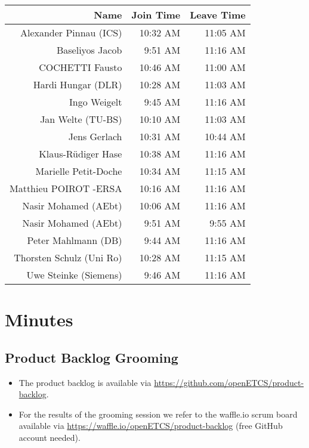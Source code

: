 \documentclass[a4paper, 11pt]{article}
\begin{document}
\begin{table}[htbp]
    \begin{tabular}{rrr}
    \toprule
    \textbf{Name} & \textbf{Join Time} & \textbf{Leave Time} \\
    \midrule
    Alexander Pinnau (ICS) & 10:32 AM & 11:05 AM \\
    Baseliyos Jacob & 9:51 AM & 11:16 AM \\
    COCHETTI Fausto & 10:46 AM & 11:00 AM \\
    Hardi Hungar (DLR) & 10:28 AM & 11:03 AM \\
    Ingo Weigelt & 9:45 AM & 11:16 AM \\
    Jan Welte (TU-BS) & 10:10 AM & 11:03 AM \\
    Jens Gerlach & 10:31 AM & 10:44 AM \\
    Klaus-R\"udiger Hase & 10:38 AM & 11:16 AM \\
    Marielle Petit-Doche & 10:34 AM & 11:15 AM \\
    Matthieu POIROT -ERSA & 10:16 AM & 11:16 AM \\
    Nasir Mohamed (AEbt) & 10:06 AM & 11:16 AM \\
    Nasir Mohamed (AEbt) & 9:51 AM & 9:55 AM \\
    Peter Mahlmann (DB) & 9:44 AM & 11:16 AM \\
    Thorsten Schulz (Uni Ro) & 10:28 AM & 11:15 AM \\
    Uwe Steinke (Siemens) & 9:46 AM & 11:16 AM \\
    \bottomrule
    \end{tabular}%
  \label{tab:addlabel}%
\end{table}%



\section{Minutes}

\subsection{Product Backlog Grooming}
\begin{itemize}
\item The product backlog is available via 
\url{https://github.com/openETCS/product-backlog}. 
\item For the results of the grooming session we refer to the waffle.io scrum board available via \url{https://waffle.io/openETCS/product-backlog} (free GitHub account needed).
\end{itemize}
\end{document}
